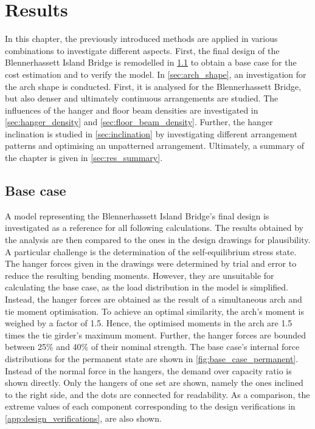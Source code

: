 \chapter{Results}\label{sec:results}
In this chapter, the previously introduced methods are applied in various combinations to investigate different aspects. First, the final design of the Blennerhassett Island Bridge is remodelled in \cref{sec:base_case} to obtain a base case for the cost estimation and to verify the model. In \cref{sec:arch_shape}, an investigation for the arch shape is conducted. First, it is analysed for the Blennerhassett Bridge, but also denser and ultimately continuous arrangements are studied. The influences of the hanger and floor beam densities are investigated in \cref{sec:hanger_density} and \cref{sec:floor_beam_density}. Further, the hanger inclination is studied in \cref{sec:inclination} by investigating different arrangement patterns and optimising an unpatterned arrangement. Ultimately, a summary of the chapter is given in \cref{sec:res_summary}.


\section{Base case} \label{sec:base_case}
A model representing the Blennerhassett Island Bridge's final design is investigated as a reference for all following calculations. The results obtained by the analysis are then compared to the ones in the design drawings for plausibility. A particular challenge is the determination of the self-equilibrium stress state. The hanger forces given in the drawings were determined by trial and error to reduce the resulting bending moments. However, they are unsuitable for calculating the base case, as the load distribution in the model is simplified. Instead, the hanger forces are obtained as the result of a simultaneous arch and tie moment optimisation. To achieve an optimal similarity, the arch's moment is weighed by a factor of 1.5. Hence, the optimised moments in the arch are 1.5 times the tie girder's maximum moment. 
Further, the hanger forces are bounded between 25\% and 40\% of their nominal strength. The base case's internal force distributions for the permanent state are shown in \cref{fig:base_case_permanent}. Instead of the normal force in the hangers, the demand over capacity ratio is shown directly. Only the hangers of one set are shown, namely the ones inclined to the right side, and the dots are connected for readability. As a comparison, the extreme values of each component corresponding to the design verifications in \cref{app:design_verifications}, are also shown.

